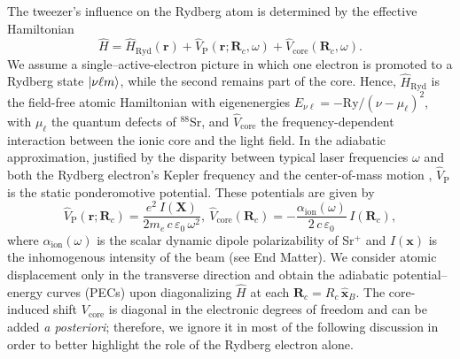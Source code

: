 \documentclass[aps,prl,groupedaddress,superscriptaddress,twocolumn,10pt,longbibliography]{revtex4-2}
\begin{document}
The tweezer's influence on the Rydberg atom is determined by the effective Hamiltonian
\begin{equation}
\hat H = \hat H_{\mathrm{Ryd}}(\boldsymbol{r}) + \hat V_{\mathrm P}(\boldsymbol{r};\boldsymbol{R}_c,\omega) + \hat V_{\mathrm{core}}(\boldsymbol{R}_c,\omega).
\label{eq:Ham}
\end{equation}
We assume a single–active-electron picture in which one electron is promoted to a Rydberg state $\ket{\nu \ell m}$, while the second remains part of the core.
Hence, $\hat H_{\mathrm{Ryd}}$ is the field-free atomic Hamiltonian with eigenenergies $E_{\nu\ell}=-\mathrm{Ry}/(\nu-\mu_{\ell})^2$, with $\mu_\ell$ the quantum defects of $^{88}$Sr, and $\hat V_{\mathrm{core}}$  the frequency-dependent interaction between the ionic core and the light field.
In the adiabatic approximation, justified by the disparity between typical laser frequencies $\omega$ and both the Rydberg electron’s Kepler frequency and the center-of-mass motion \cite{Duta2000}, $\hat V_{\mathrm P}$ is the static ponderomotive potential.
These potentials are given by
\begin{equation}
\hat V_{\mathrm P}(\boldsymbol{r};\boldsymbol{R}_c)= \frac{e^2 \ I(\boldsymbol{X})}{2 m_e\,c\,\varepsilon_0\,\omega^2},
\  \hat V_{\mathrm{core}}(\boldsymbol{R}_c)
= -\frac{\alpha_{\mathrm{ion}}(\omega)}{2\,c\,\varepsilon_0}\,  I(\boldsymbol{R}_c),
\label{eq:Up}
\end{equation}
where $\alpha_{\mathrm{ion}}(\omega)$ is the scalar dynamic dipole polarizability of Sr$^+$ and $I(\boldsymbol{x})$ is the inhomogenous intensity of the beam (see End Matter).
We consider atomic displacement only in the transverse direction and obtain the adiabatic potential–energy curves (PECs) upon diagonalizing $\hat H$ at each $\boldsymbol{R}_c{=}R_c \, \hat{\boldsymbol{x}}_B$.
 The core-induced shift $V_{\mathrm{core}}$ is diagonal in the electronic degrees of freedom and can be added \textit{a posteriori}; therefore, we ignore it in most of the following discussion in order to better highlight the role of the Rydberg electron alone.
\end{document}
